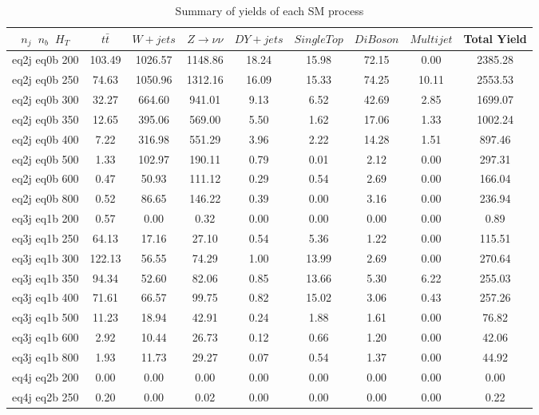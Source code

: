 \begin{longtable}{| c | c | c | c | c | c | c | c | c  | }
\caption{Summary of yields of each SM process} \label{tab:table} \\    \hline 
$n_{j}$~$n_{b}$~$H_{T}$ & $t\bar{t}$ & $W+jets$ & $Z \rightarrow \nu\nu$ & $DY+jets$ & $Single Top$ & $DiBoson$ & $Multijet$ & Total Yield\\ \hline 
eq2j eq0b 200 & 103.49 & 1026.57 & 1148.86 & 18.24 & 15.98 & 72.15 & 0.00 & 2385.28\\ \hline 
eq2j eq0b 250 & 74.63 & 1050.96 & 1312.16 & 16.09 & 15.33 & 74.25 & 10.11 & 2553.53\\ \hline 
eq2j eq0b 300 & 32.27 & 664.60 & 941.01 & 9.13 & 6.52 & 42.69 & 2.85 & 1699.07\\ \hline 
eq2j eq0b 350 & 12.65 & 395.06 & 569.00 & 5.50 & 1.62 & 17.06 & 1.33 & 1002.24\\ \hline 
eq2j eq0b 400 & 7.22 & 316.98 & 551.29 & 3.96 & 2.22 & 14.28 & 1.51 & 897.46\\ \hline 
eq2j eq0b 500 & 1.33 & 102.97 & 190.11 & 0.79 & 0.01 & 2.12 & 0.00 & 297.31\\ \hline 
eq2j eq0b 600 & 0.47 & 50.93 & 111.12 & 0.29 & 0.54 & 2.69 & 0.00 & 166.04\\ \hline 
eq2j eq0b 800 & 0.52 & 86.65 & 146.22 & 0.39 & 0.00 & 3.16 & 0.00 & 236.94\\ \hline 
eq3j eq1b 200 & 0.57 & 0.00 & 0.32 & 0.00 & 0.00 & 0.00 & 0.00 & 0.89\\ \hline 
eq3j eq1b 250 & 64.13 & 17.16 & 27.10 & 0.54 & 5.36 & 1.22 & 0.00 & 115.51\\ \hline 
eq3j eq1b 300 & 122.13 & 56.55 & 74.29 & 1.00 & 13.99 & 2.69 & 0.00 & 270.64\\ \hline 
eq3j eq1b 350 & 94.34 & 52.60 & 82.06 & 0.85 & 13.66 & 5.30 & 6.22 & 255.03\\ \hline 
eq3j eq1b 400 & 71.61 & 66.57 & 99.75 & 0.82 & 15.02 & 3.06 & 0.43 & 257.26\\ \hline 
eq3j eq1b 500 & 11.23 & 18.94 & 42.91 & 0.24 & 1.88 & 1.61 & 0.00 & 76.82\\ \hline 
eq3j eq1b 600 & 2.92 & 10.44 & 26.73 & 0.12 & 0.66 & 1.20 & 0.00 & 42.06\\ \hline 
eq3j eq1b 800 & 1.93 & 11.73 & 29.27 & 0.07 & 0.54 & 1.37 & 0.00 & 44.92\\ \hline 
eq4j eq2b 200 & 0.00 & 0.00 & 0.00 & 0.00 & 0.00 & 0.00 & 0.00 & 0.00\\ \hline 
eq4j eq2b 250 & 0.20 & 0.00 & 0.02 & 0.00 & 0.00 & 0.00 & 0.00 & 0.22\\ \hline 

\end{longtable}
